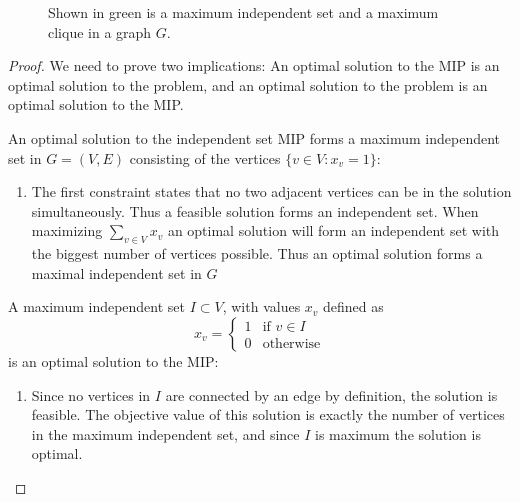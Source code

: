 \begin{example}
\begin{figure}[H]
\caption{Shown in green is a maximum independent set and a maximum clique in a graph $G$.}
\end{figure}
\begin{proof}
We need to prove two implications: An optimal solution to the MIP is an optimal solution to the problem, and an optimal solution to the problem is an optimal solution to the MIP. 

An optimal solution to the independent set MIP forms a maximum independent set in $G=(V,E)$ consisting of the vertices $\{v\in V:x_v=1\}$:
\begin{enumerate}
\item The first constraint states that no two adjacent vertices can be in the solution simultaneously. Thus a feasible solution forms an independent set.
When maximizing $\sum_{v\in V} x_v$ an optimal solution will form an independent set with the biggest number of vertices possible. Thus an optimal solution forms a maximal independent set in $G$
\end{enumerate}
A maximum independent set $I\subset V$, with values $x_v$ defined as $$x_{v} = \left\{
\begin{array}{ll}
1 & \text{if } v \in I \\ 0 & \text{otherwise}
\end{array}\right.$$ is an optimal solution to the MIP:
\begin{enumerate}
\item Since no vertices in $I$ are connected by an edge by definition, the solution is feasible. The objective value of this solution is exactly the number of vertices in the maximum independent set, and since $I$ is maximum the solution is optimal.
\end{enumerate}


\end{proof}
\end{example}
